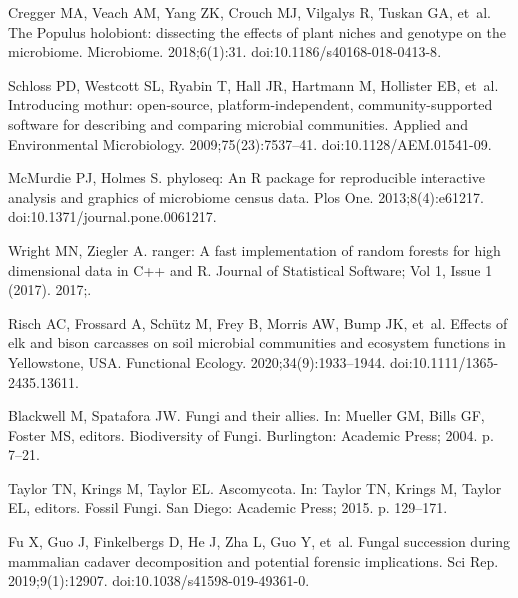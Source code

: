\documentclass[
  10pt,
  letterpaper,
]{article}
\begin{document}
\begin{thebibliography}{10}
    Cregger MA, Veach AM, Yang ZK, Crouch MJ, Vilgalys R, Tuskan GA, et~al.
    \newblock The {Populus} holobiont: dissecting the effects of plant niches and genotype on the microbiome.
    \newblock Microbiome. 2018;6(1):31.
    \newblock doi:{10.1186/s40168-018-0413-8}.
    
    Schloss PD, Westcott SL, Ryabin T, Hall JR, Hartmann M, Hollister EB, et~al.
    \newblock Introducing mothur: open-source, platform-independent, community-supported software for describing and comparing microbial communities.
    \newblock Applied and Environmental Microbiology. 2009;75(23):7537--41.
    \newblock doi:{10.1128/AEM.01541-09}.
    
    McMurdie PJ, Holmes S.
    \newblock phyloseq: {An} {R} package for reproducible interactive analysis and graphics of microbiome census data.
    \newblock Plos One. 2013;8(4):e61217.
    \newblock doi:{10.1371/journal.pone.0061217}.
    
    Wright MN, Ziegler A.
    \newblock ranger: {A} fast implementation of random forests for high dimensional data in {C}++ and {R}.
    \newblock Journal of Statistical Software; Vol 1, Issue 1 (2017). 2017;.
    
    Risch AC, Frossard A, Schütz M, Frey B, Morris AW, Bump JK, et~al.
    \newblock Effects of elk and bison carcasses on soil microbial communities and ecosystem functions in {Yellowstone}, {USA}.
    \newblock Functional Ecology. 2020;34(9):1933--1944.
    \newblock doi:{10.1111/1365-2435.13611}.
    
    Blackwell M, Spatafora JW.
    \newblock Fungi and their allies.
    \newblock In: Mueller GM, Bills GF, Foster MS, editors. Biodiversity of {Fungi}. Burlington: Academic Press; 2004. p. 7--21.
    
    Taylor TN, Krings M, Taylor EL.
    \newblock Ascomycota.
    \newblock In: Taylor TN, Krings M, Taylor EL, editors. Fossil {Fungi}. San Diego: Academic Press; 2015. p. 129--171.
    
    Fu X, Guo J, Finkelbergs D, He J, Zha L, Guo Y, et~al.
    \newblock Fungal succession during mammalian cadaver decomposition and potential forensic implications.
    \newblock Sci Rep. 2019;9(1):12907.
    \newblock doi:{10.1038/s41598-019-49361-0}.
    

\end{thebibliography}
\end{document}

